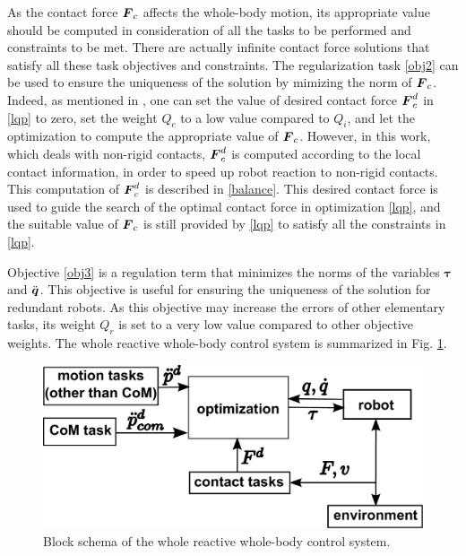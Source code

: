 \documentclass[letterpaper, 10 pt, conference]{ieeeconf}  %
\newcommand{\vect}[1]{\mbox{\boldmath${#1}$}}%
\begin{document}
As the contact force $\vect{F}_c$ affects the whole-body motion, its appropriate value should be computed in consideration of all the tasks to be performed and constraints to be met. There are actually  infinite contact force solutions that satisfy all these task objectives and constraints. The regularization task \eqref{obj2} can be used to ensure the uniqueness of the solution by mimizing the norm of $\vect{F}_c$. Indeed, as mentioned in \cite{Liu11}, one can set the value of desired contact force $\vect{F}_c^d$ in \eqref{lqp} to zero, set the weight $Q_c$ to a low value compared to $Q_i$, and let the optimization to compute the appropriate value of $\vect{F}_c$.  
However, in this work, which deals with non-rigid contacts,  $\vect{F}_c^d$ is computed according to the local contact information, in order to speed up robot reaction to non-rigid contacts. This computation of $\vect{F}_c^d$ is described in \ref{balance}. This desired contact force is used to guide the search of the optimal contact force in optimization \eqref{lqp}, and the suitable value of $\vect{F}_c$ is still provided by \eqref{lqp} to satisfy all the constraints in \eqref{lqp}.

Objective \eqref{obj3} is a regulation term that minimizes the norms of the variables $\boldsymbol{\tau}$ and $\ddot{\vect{q}}$. This objective is useful for ensuring the uniqueness of the solution for redundant robots. As this objective may increase the errors of other elementary tasks, its weight $Q_r$ is set to a very low value compared to other objective weights. 
The whole reactive whole-body control system is summarized in Fig. \ref{schema}.
\begin{figure}[!t]
\centering
\vspace{5pt}
\includegraphics[width=.8\linewidth]{../figure/schema.pdf}
\caption{Block schema of the whole reactive whole-body control system.}
\label{schema}
\end{figure}
\end{document}
